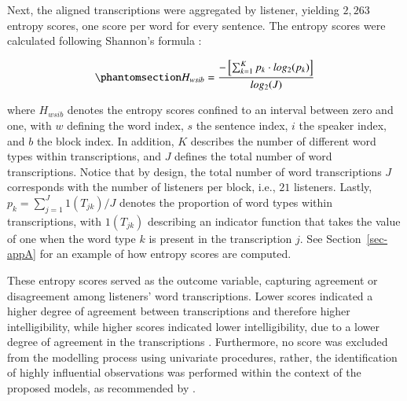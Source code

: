 \documentclass[
  authoryear,
  preprint,
  1p]{elsarticle}
\begin{document}
Next, the aligned transcriptions were aggregated by listener, yielding
\(2,263\) entropy scores, one score per word for every sentence. The
entropy scores were calculated following Shannon's formula
\citeyearpar{Shannon_1948}:

\begin{equation}\phantomsection\label{eq-entropy}{
H_{wsib} = \frac{ -\left[ \sum_{k=1}^{K}  p_{k} \cdot log_{2}(p_{k}) \right] }{ log_{2}(J)}
}\end{equation}

where \(H_{wsib}\) denotes the entropy scores confined to an interval
between zero and one, with \(w\) defining the word index, \(s\) the
sentence index, \(i\) the speaker index, and \(b\) the block index. In
addition, \(K\) describes the number of different word types within
transcriptions, and \(J\) defines the total number of word
transcriptions. Notice that by design, the total number of word
transcriptions \(J\) corresponds with the number of listeners per block,
i.e., \(21\) listeners. Lastly, \(p_{k} = \sum_{j=1}^{J} 1(T_{jk}) / J\)
denotes the proportion of word types within transcriptions, with
\(1(T_{jk})\) describing an indicator function that takes the value of
one when the word type \(k\) is present in the transcription \(j\). See
Section~\ref{sec-appA} for an example of how entropy scores are
computed.

These entropy scores served as the outcome variable, capturing agreement
or disagreement among listeners' word transcriptions. Lower scores
indicated a higher degree of agreement between transcriptions and
therefore higher intelligibility, while higher scores indicated lower
intelligibility, due to a lower degree of agreement in the
transcriptions \citep{Boonen_et_al_2023, Faes_et_al_2022}. Furthermore,
no score was excluded from the modelling process using univariate
procedures, rather, the identification of highly influential
observations was performed within the context of the proposed models, as
recommended by \citet{McElreath_2020}.
\end{document}
